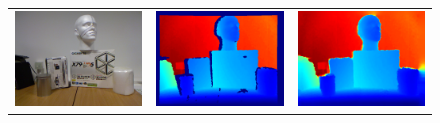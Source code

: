 \documentclass[10pt,onecolumn,letterpaper]{article}
\begin{document}
\begin{figure}[b]
\begin{tabular}{ccc}
    \centering 
    \includegraphics[width=\preprocesssubwidth]{process/preprocess_a} & 
    \includegraphics[width=\preprocesssubwidth]{process/preprocess_b} &
    \includegraphics[width=\preprocesssubwidth]{process/preprocess_c} \\ 

\end{tabular}
\end{figure}
\end{document}
